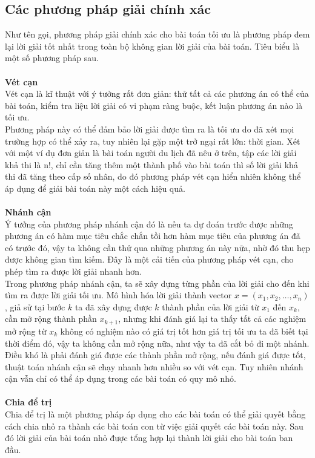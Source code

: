 \subsection{Các phương pháp giải chính xác}
Như tên gọi, phương pháp giải chính xác cho bài toán tối ưu là phương pháp đem lại lời giải tốt nhất trong toàn bộ không gian lời giải của bài toán. Tiêu biểu là một số phương pháp sau.
\\ \\\textbf{Vét cạn}
\\Vét cạn là kĩ thuật với ý tưởng rất đơn giản: thử tất cả các phương án có thể của bài toán, kiểm tra liệu lời giải có vi phạm ràng buộc, kết luận phương án nào là tối ưu.
\\Phương pháp này có thể đảm bảo lời giải được tìm ra là tối ưu do đã xét mọi trường hợp có thể xảy ra, tuy nhiên lại gặp một trở ngại rất lớn: thời gian. Xét với một ví dụ đơn giản là bài toán người du lịch đã nêu ở trên, tập các lời giải khả thi là n!, chỉ cần tăng thêm một thành phố vào bài toán thì số lời giải khả thi đã tăng theo cấp số nhân, do đó phương pháp vét cạn hiển nhiên không thể áp dụng để giải bài toán này một cách hiệu quả.
\\ \\\textbf{Nhánh cận}
\\Ý tưởng của phương pháp nhánh cận đó là nếu ta dự đoán trước được những phương án có hàm mục tiêu chắc chắn tồi hơn hàm mục tiêu của phương án đã có trước đó, vậy ta không cần thử qua những phương án này nữa, nhờ đó thu hẹp được không gian tìm kiếm. Đây là một cải tiến của phương pháp vét cạn, cho phép tìm ra được lời giải nhanh hơn.
\\Trong phương pháp nhánh cận, ta sẽ xây dựng từng phần của lời giải cho đến khi tìm ra được lời giải tối ưu. Mô hình hóa lời giải thành vector $x = (x_1, x_2, …, x_n)$, giả sử tại bước $k$ ta đã xây dựng được $k$ thành phần của lời giải từ $x_1$ đến $x_k$, cần mở rộng thành phần $x_{k+1}$, nhưng khi đánh giá lại ta thấy tất cả các nghiệm mở rộng từ $x_k$ không có nghiệm nào có giá trị tốt hơn giá trị tối ưu ta đã biết tại thời điểm đó, vậy ta không cần mở rộng nữa, như vậy ta đã cắt bỏ đi một nhánh. 
\\Điều khó là phải đánh giá được các thành phần mở rộng, nếu đánh giá được tốt, thuật toán nhánh cận sẽ chạy nhanh hơn nhiều so với vét cạn. Tuy nhiên nhánh cận vẫn chỉ có thể áp dụng trong các bài toán có quy mô nhỏ.
\\ \\\textbf{Chia để trị}
\\Chia để trị là một phương pháp áp dụng cho các bài toán có thể giải quyết bằng cách chia nhỏ ra thành các bài toán con từ việc giải quyết các bài toán này. Sau đó lời giải của bài toán nhỏ được tổng hợp lại thành lời giải cho bài toán ban đầu.
